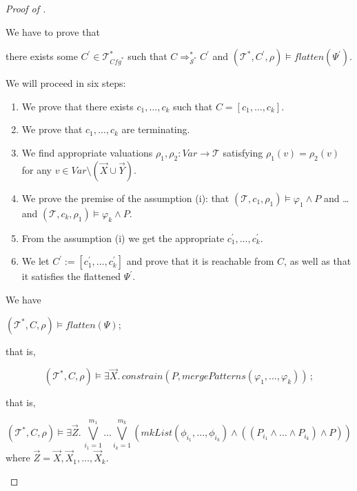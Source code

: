 \documentclass{article}
\newenvironment{proofenv}
  {
    \VerbatimEnvironment\begin{tcolorbox}[colback=black!0!white] %
  }
  {
   \end{tcolorbox}
  }
\begin{document}
\begin{proof}[Proof of ]
\begin{enumerate}
    We have to prove that
    \begin{proofenv}
    there exists some $C^\prime \in \mathcal{T}^*_{\mathit{Cfg}^*}$
    such that
    $C \Rightarrow^{*}_{\mathcal{S}^*} C^\prime$
    and $(\mathcal{T}^*, C^\prime, \rho) \vDash \mathit{flatten}(\Psi^\prime)$.
    \end{proofenv}
    We will proceed in six steps:
    \begin{enumerate}
        \item We prove that there exists $c_1,\ldots,c_k$ such that $C = [c_1,\ldots, c_k]$.
        \item We prove that $c_1,\ldots,c_k$ are terminating.
        \item We find appropriate valuations $\rho_1,\rho_2 : \mathit{Var} \to \mathcal{T}$
        satisfying $\rho_1(v) = \rho_2(v)$ for any $v \in \mathit{Var} \setminus (\vec{X} \cup \vec{Y})$.
        \item We prove the premise of the assumption (i): that $(\mathcal{T}, c_1, \rho_1) \vDash \varphi_1 \land P$
        and \ldots and $(\mathcal{T}, c_k, \rho_1) \vDash \varphi_k \land P$.
        \item From the assumption (i) we get the appropriate $c_1^\prime,\ldots,c_k^\prime$.
        \item We let $C^\prime := [c_1^\prime,\ldots,c_k^\prime]$ and prove that it is reachable from $C$,
        as well as that it satisfies the flattened $\Psi^\prime$.
    \end{enumerate}
    We have
    \begin{proofenv}
    $(\mathcal{T}^*, C, \rho) \vDash \mathit{flatten}(\Psi)$;
    \end{proofenv}
    that is,
    \begin{proofenv}
    \begin{equation*}
     (\mathcal{T}^*, C, \rho) \vDash \exists \vec{X}.\, \mathit{constrain}(P, \mathit{mergePatterns}(\varphi_1,\ldots,\varphi_k))    \, ;
    \end{equation*}
    \end{proofenv}
    that is,
    \begin{proofenv}
    \begin{equation*}
     (\mathcal{T}^*, C, \rho) \vDash \exists \vec{Z}.\, \bigvee_{i_1 = 1}^{m_1} \ldots \bigvee_{i_k = 1}^{m_k} (
    \mathit{mkList}(\phi_{i_1}, \ldots, \phi_{i_k}) \land ((P_{i_1} \land \ldots \land P_{i_k}) \land P) )
    \end{equation*}
    where $\mathit{\vec{Z}} = \vec{X},\vec{X}_1,\ldots,\vec{X}_k$.

\end{proofenv}
\end{enumerate}
\end{proof}
\end{document}
